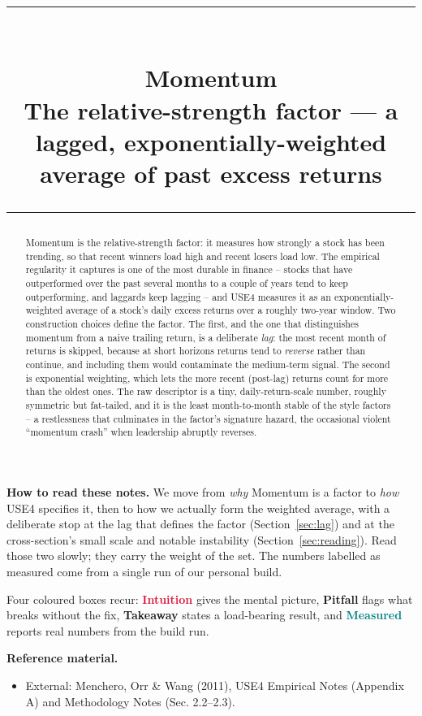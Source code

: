 \documentclass[11pt]{article}
\title{\vspace{-2.2em}
  {\color{steel}\rule{\textwidth}{1.3pt}}\\[0.7em]
  \Huge\bfseries Momentum\\[0.35em]
  \large\mdseries The relative-strength factor --- a lagged, exponentially-weighted average of past excess returns\\[0.4em]
  {\color{steel}\rule{\textwidth}{0.7pt}}}
\author{}
\date{}
\theoremstyle{definition}
\theoremstyle{plain}
\theoremstyle{remark}
\begin{document}
\maketitle
\thispagestyle{empty}

\begin{abstract}
Momentum is the relative-strength factor: it measures how strongly a stock has been trending, so that recent winners load high and recent losers load low. The empirical regularity it captures is one of the most durable in finance -- stocks that have outperformed over the past several months to a couple of years tend to keep outperforming, and laggards keep lagging -- and USE4 measures it as an exponentially-weighted average of a stock's daily excess returns over a roughly two-year window. Two construction choices define the factor. The first, and the one that distinguishes momentum from a naive trailing return, is a deliberate \emph{lag}: the most recent month of returns is skipped, because at short horizons returns tend to \emph{reverse} rather than continue, and including them would contaminate the medium-term signal. The second is exponential weighting, which lets the more recent (post-lag) returns count for more than the oldest ones. The raw descriptor is a tiny, daily-return-scale number, roughly symmetric but fat-tailed, and it is the least month-to-month stable of the style factors -- a restlessness that culminates in the factor's signature hazard, the occasional violent ``momentum crash'' when leadership abruptly reverses.
\end{abstract}

\begin{tcolorbox}[colback=paperlt,colframe=ink!30,boxrule=0.4pt,arc=2pt,left=10pt,right=10pt,top=8pt,bottom=8pt]
\textbf{How to read these notes.} We move from \emph{why} Momentum is a factor to \emph{how} USE4 specifies it, then to how we actually form the weighted average, with a deliberate stop at the lag that defines the factor (Section~\ref{sec:lag}) and at the cross-section's small scale and notable instability (Section~\ref{sec:reading}). Read those two slowly; they carry the weight of the set. The numbers labelled as measured come from a single run of our personal build.

\smallskip
Four coloured boxes recur: \textcolor{crimson}{\textbf{Intuition}} gives the mental picture, \textcolor{amber}{\textbf{Pitfall}} flags what breaks without the fix, \textcolor{steel}{\textbf{Takeaway}} states a load-bearing result, and \textcolor{teal}{\textbf{Measured}} reports real numbers from the build run.

\smallskip
\textbf{Reference material.}
\begin{itemize}[leftmargin=1.4em,topsep=2pt]
  \item External: Menchero, Orr \& Wang (2011), USE4 Empirical Notes (Appendix A) and Methodology Notes (Sec. 2.2--2.3).
\end{itemize}
\end{tcolorbox}
\end{document}
